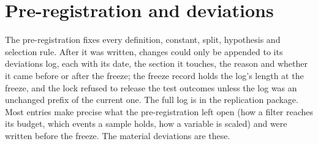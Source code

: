 \section{Pre-registration and deviations}\label{app:prereg}

The pre-registration fixes every definition, constant, split, hypothesis and selection rule. After it was
written, changes could only be appended to its deviations log, each with its date, the section it touches, the
reason and whether it came before or after the freeze; the freeze record holds the log's length at the freeze, and
the lock refused to release the test outcomes unless the log was an unchanged prefix of the current one. The full
log is in the replication package. Most entries make precise what the pre-registration left open (how a filter
reaches its budget, which events a sample holds, how a variable is scaled) and were written before the freeze.
The material deviations are these.
